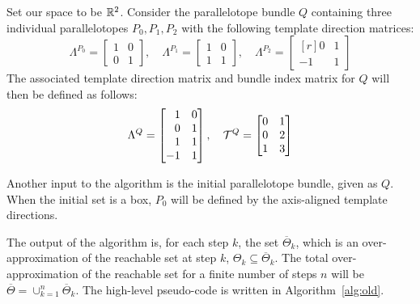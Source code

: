 \begin{example}
Set our space to be ${\mathbb{R}}^2$. Consider the parallelotope bundle $Q$ containing three individual parallelotopes $P_0, P_1, P_2$ with the following template direction matrices:
  \begin{equation*}
    \Lambda^{P_0}  = \begin{bmatrix}
                  1 & 0 \\
                  0 & 1
                  \end{bmatrix}, \quad
    \Lambda^{P_1}  = \begin{bmatrix}
                    1 & 0 \\
                    1 & 1
                    \end{bmatrix}, \quad
    \Lambda^{P_2} = \begin{bmatrix*}[r]
                    0 & 1 \\
                   -1 & 1
                    \end{bmatrix*}
  \end{equation*}
  The associated template direction matrix and bundle index matrix for $Q$ will then be defined as follows:
  \begin{equation*}
    \Lambda^{Q} = \begin{bmatrix*}[r]
                  1 & 0 \\
                  0 & 1 \\
                  1 & 1 \\
                  -1 & 1
                  \end{bmatrix*}, \quad
                  \T^Q = \begin{bmatrix}
                          0 & 1 \\
                          0 & 2 \\
                          1 & 3
                         \end{bmatrix}
  \end{equation*}
\end{example}

\noindent Another input to the algorithm is the initial parallelotope bundle, given as $Q$. When the initial set is a box, $P_0$ will be defined by the axis-aligned template directions.

The output of the algorithm is, for each step $k$, the set $\overline\Theta_k$, which is an over-approximation of the reachable set at step $k$, $\Theta_k \subseteq \overline\Theta_k$. The total over-approximation of the reachable set for a finite number of steps $n$ will be $\overline\Theta = \cup_{k=1}^n \overline\Theta_k$.
%
The high-level pseudo-code is written in Algorithm~\ref{alg:old}.


